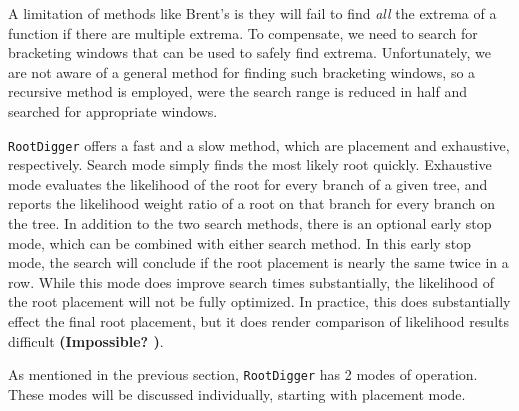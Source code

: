 \documentclass{article}
\newcommand{\RootDiggertt}{\texttt{RootDigger}}
\newcommand{\BenComment}[1]{{\bf \color{blue} ({#1})}}
\begin{document}

A limitation of methods like Brent's is they will fail to find {\it all} the
extrema of a function if there are multiple extrema.
To compensate, we need to search for bracketing windows that can be used to
safely find extrema.
Unfortunately, we are not aware of a general method for finding such bracketing
windows, so a recursive method is employed, were the search range is reduced in
half and searched for appropriate\footnotemark{} windows.


\RootDiggertt{} offers a fast and a slow method, which are placement and
exhaustive, respectively.  Search mode simply finds the most likely root
quickly. Exhaustive mode evaluates the likelihood of the root for every branch
of a given tree, and reports the likelihood weight ratio
\cite{strimmer_inferring_2002} of a root on that branch for every branch on the
tree.  In addition to the two search methods, there is an optional early stop
mode, which can be combined with either search method.  In this early stop mode,
the search will conclude if the root placement is nearly the same twice in a
row.  While this mode does improve search times substantially, the likelihood of
the root placement will not be fully optimized.  In practice, this does
substantially effect the final root placement, but it does render comparison of
likelihood results difficult \BenComment{Impossible?  }.

As mentioned in the previous section, \RootDiggertt{} has 2 modes of operation.
These modes will be discussed individually, starting with placement mode.
\end{document}
